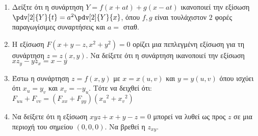 \begin{enumerate}
  \item Δείξτε ότι η συνάρτηση $Y=f(x+at)+g(x-at)$ ικανοποιεί την εξίσωση $\pdv[2]{Y}{t}=a^{2}\pdv[2]{Y}{x}$, όπου $f,g$ είναι τουλάχιστον $2$ φορές παραγωγίσιμες συναρτήσεις και $a=$ σταθ.

  \item Η εξίσωση $F(x+y-z,x^{2}+y^{2})=0$ ορίζει μια πεπλεγμένη εξίσωση για τη συνάρτηση $z=z(x,y)$. Να δείξετε ότι η συνάρτηση ικανοποιεί την εξίσωση $xz_{y}-yz_{x}=x-y$

  \item Έστω η συνάρτηση $z=f(x,y)$ με $x=x(u,v)$ και $y=y(u,v)$ όπου ισχύει ότι $x_{u}=y_{v}$ και $x_{v}=-y_{u}$. Τότε να δειχθεί ότι: $F_{uu}+F_{vv}=(F_{xx}+F_{yy})({x_{u}}^{2}+{x_{v}}^{2})$

  \item Να δείξετε ότι η εξίσωση $xyz+x+y-z=0$ μπορεί να λυθεί ως προς $z$ σε μια περιοχή του σημείου $(0,0,0)$. Να βρεθεί η $z_{xy}$.
  \end{enumerate}




